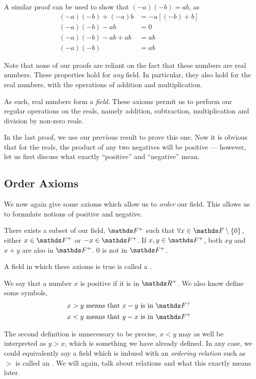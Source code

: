 A similar proof can be used to show that \((-a)(-b) = ab\), as 
\begin{align*}
    (-a)(-b) + (-a)b &= -a[(-b) + b] \\
    (-a)(-b) - ab &= 0\\
    (-a)(-b) - ab + ab &= ab\\
    (-a)(-b) &= ab
\end{align*}

Note that none of our proofs are reliant on the fact that these numbers are 
real numbers. These properties hold for \emph{any} field. In particular, 
they also hold for the real numbers, with the operations of addition and multiplication.

As such, real numbers form a \emph{field}. These axioms permit us to perform our regular operations on 
the reals, namely addition, subtraction, multiplication and division by non-zero
reals.

In the last proof, we use our previous result to prove this one. Now it is obvious that for 
the reals, the product of any two negatives will be positive --- however, let us first discuss what exactly ``positive''
and ``negative'' mean.

\subsection{Order Axioms}

We now again give some axioms which allow us to \emph{order} our field. This allows us to formulate notions 
of positive and negative. 

\begin{axioms}
    \ii There exists a subset of our field, \(\FF^+\) such that \(\forall x \in \FF \setminus \Set{0}\),
     either \(x \in \FF^+\) or \(-x \in \FF^+\).
    \ii If \(x, y \in \FF^+\), both \(xy\) and \(x + y\) are also in \(\FF^+\).
    \ii \(0\) is not in \(\FF^+\).
\end{axioms}

A field in which these axioms is true is called a .

We say that a number \(x\) is positive if it is in \(\RR^+\). We also know define some symbols, 
\begin{align*}
    x > y \text{ means that } x - y \text{ is in } \FF^+ \\
    x < y \text{ means that } y - x \text{ is in } \FF^+ 
\end{align*}

The second definition is unnecessary to be precise, \(x < y\) may as well be 
interpreted as \(y > x\), which is something we have already defined. In any case, 
we could equivalently say a field which is imbued with an \emph{ordering relation} such as \(>\) is called 
an . We will again, talk about relations and what this exactly 
means later.

